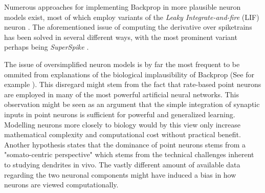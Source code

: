 Numerous approaches for implementing Backprop in more plausible neuron models exist, most of which employ variants of
the \textit{Leaky Integrate-and-fire} (LIF) neuron \citep{Sporea2013,Lee2016,Bengio2017,Lee2020}. The aforementioned
issue of computing the derivative over spiketrains has been solved in several different ways, with the most prominent
variant perhaps being \textit{SuperSpike} \citep{Zenke2018}. 

The issue of oversimplified neuron models is by far the most frequent to be ommited from explanations of the biological
implausibility of Backprop (See for example \citep{Meulemans2020,Lillicrap2014}). This disregard might stem from the
fact that rate-based point neurons are employed in many of the most powerful artificial neural networks. This
observation might be seen as an argument that the simple integration of synaptic inputs in point neurons is sufficient
for powerful and generalized learning. Modelling neurons more closely to biology would by this view only increase
mathematical complexity and computational cost without practical benefit. Another hypothesis states that the dominance
of point neurons stems from a "somato-centric perspective" \citep{Larkum2018} which stems from the technical challenges
inherent to studying dendrites in vivo. The vastly different amount of available data regarding the two neuronal
components might have induced a bias in how neurons are viewed computationally.  



